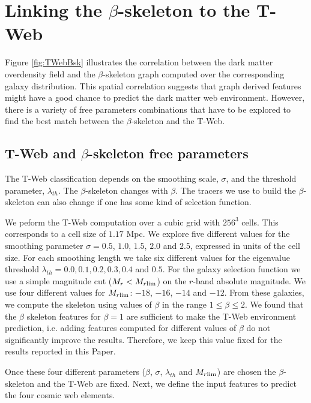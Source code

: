 \documentclass[usenatbib]{mnras}
\begin{document}
\section{Linking the $\beta$-skeleton to the T-Web}\label{sec:link}

Figure \ref{fig:TWebBsk} illustrates the correlation between the dark matter overdensity field and the $\beta$-skeleton graph computed over the corresponding galaxy distribution. 
This spatial correlation suggests that graph derived features might have
a good chance to predict the dark matter web environment. 
However, there is a variety of free parameters combinations that have to be explored to find the best match between the $\beta$-skeleton and the T-Web.

\subsection{T-Web and $\beta$-skeleton free parameters}

The T-Web classification depends on the smoothing scale, $\sigma$, and the threshold parameter, $\lambda_{th}$.
The $\beta$-skeleton changes with $\beta$.
The tracers we use to build the $\beta$-skeleton can also change if one has some kind of selection function.

We peform the T-Web computation over a cubic grid with $256^3$
cells. 
This corresponds to a cell size of $1.17$ Mpc.
We explore five different values for the smoothing parameter $\sigma =
0.5$, $1.0$, $1.5$, $2.0$ and $2.5$, expressed in units of the cell size.
For each smoothing length we take six different values for
the eigenvalue threshold
$\lambda_{th}=0.0, 0.1, 0.2, 0.3, 0.4$ and $0.5$. 
For the galaxy selection function we use a simple magnitude cut ($M_{r}<M_{r\rm{lim}}$) on the $r$-band absolute magnitude.
We use four different values for $M_{r\rm{lim}}$: $-18$, $-16$, $-14$ and $-12$. 
From these galaxies, we compute the skeleton using values of $\beta$ in
the range $1\leq \beta \leq 2$.
We found that the $\beta$ skeleton features for $\beta=1$ are sufficient to make the T-Web environment prediction, i.e. adding features computed for different values of $\beta$ do not significantly improve the results.
Therefore, we keep this value fixed for the results reported in this Paper.

Once these four different parameters ($\beta$,
$\sigma$, $\lambda_{th}$ and $M_{r\rm{lim}}$) are chosen the $\beta$-skeleton and the T-Web are fixed.  
Next, we define the input features to predict the four cosmic web elements.
\end{document}

